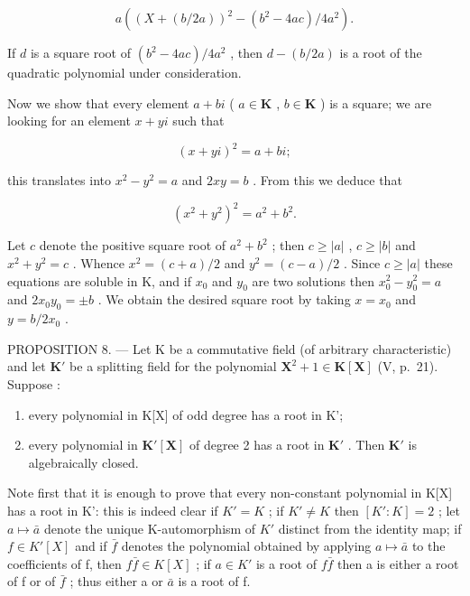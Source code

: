 \[
a \left(\left(X + (b / 2 a)\right) ^ {2} - \left(b ^ {2} - 4 a c\right) / 4 a ^ {2}\right).
\]

If \(d\) is a square root of \((b^2 - 4ac) / 4a^2\) , then \(d - (b / 2a)\) is a root of the quadratic polynomial under consideration.

Now we show that every element \(a + bi\) ( \(a \in \mathbf{K}\) , \(b \in \mathbf{K}\) ) is a square; we are looking for an element \(x + yi\) such that

\[
(x + y i) ^ {2} = a + b i;
\]

this translates into \(x^{2} - y^{2} = a\) and \(2xy = b\) . From this we deduce that

\[
(x ^ {2} + y ^ {2}) ^ {2} = a ^ {2} + b ^ {2}.
\]

Let \(c\) denote the positive square root of \(a^2 + b^2\) ; then \(c \geqslant |a|\) , \(c \geqslant |b|\) and \(x^2 + y^2 = c\) . Whence \(x^2 = (c + a)/2\) and \(y^2 = (c - a)/2\) . Since \(c \geqslant |a|\) these equations are soluble in K, and if \(x_0\) and \(y_0\) are two solutions then \(x_0^2 - y_0^2 = a\) and \(2x_0y_0 = \pm b\) . We obtain the desired square root by taking \(x = x_0\) and \(y = b/2x_0\) .

PROPOSITION 8. --- Let K be a commutative field (of arbitrary characteristic) and let \(\mathbf{K}'\) be a splitting field for the polynomial \(\mathbf{X}^2 + 1 \in \mathbf{K}[\mathbf{X}]\) (V, p.~21). Suppose :

\begin{enumerate}
\def\labelenumi{\alph{enumi})}
\item
  every polynomial in K{[}X{]} of odd degree has a root in K';
\item
  every polynomial in \(\mathbf{K}'[\mathbf{X}]\) of degree 2 has a root in \(\mathbf{K}'\) . Then \(\mathbf{K}'\) is algebraically closed.
\end{enumerate}

Note first that it is enough to prove that every non-constant polynomial in K{[}X{]} has a root in K': this is indeed clear if \(K' = K\) ; if \(K' \neq K\) then \([K': K] = 2\) ; let \(a \mapsto \bar{a}\) denote the unique K-automorphism of \(K'\) distinct from the identity map; if \(f \in K'[X]\) and if \(\bar{f}\) denotes the polynomial obtained by applying \(a \mapsto \bar{a}\) to the coefficients of f, then \(f\bar{f} \in K[X]\) ; if \(a \in K'\) is a root of \(f\bar{f}\) then a is either a root of f or of \(\bar{f}\) ; thus either a or \(\bar{a}\) is a root of f.

